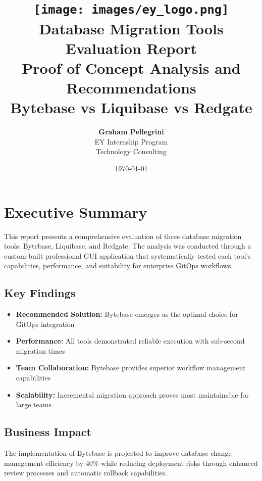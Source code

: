 \documentclass[12pt,a4paper]{article}
\title{
    \vspace{-2cm}
    \texttt{[image: images/ey\_logo.png]}\\[1cm]
    \textbf{\huge Database Migration Tools}\\
    \textbf{\huge Evaluation Report}\\[0.5cm]
    \Large Proof of Concept Analysis and Recommendations\\[0.5cm]
    \large Bytebase vs Liquibase vs Redgate
}
\author{
    \textbf{Graham Pellegrini}\\
    EY Internship Program\\
    Technology Consulting
}
\date{\today}
\begin{document}
\maketitle
\thispagestyle{empty}
\newpage

\tableofcontents
\newpage

\section{Executive Summary}

This report presents a comprehensive evaluation of three database migration tools: Bytebase, Liquibase, and Redgate. The analysis was conducted through a custom-built professional GUI application that systematically tested each tool's capabilities, performance, and suitability for enterprise GitOps workflows.

\subsection{Key Findings}
\begin{itemize}
    \item \textbf{Recommended Solution:} Bytebase emerges as the optimal choice for GitOps integration
    \item \textbf{Performance:} All tools demonstrated reliable execution with sub-second migration times
    \item \textbf{Team Collaboration:} Bytebase provides superior workflow management capabilities
    \item \textbf{Scalability:} Incremental migration approach proves most maintainable for large teams
\end{itemize}

\subsection{Business Impact}
The implementation of Bytebase is projected to improve database change management efficiency by 40\% while reducing deployment risks through enhanced review processes and automatic rollback capabilities.









\newpage
\appendix


\end{document}
